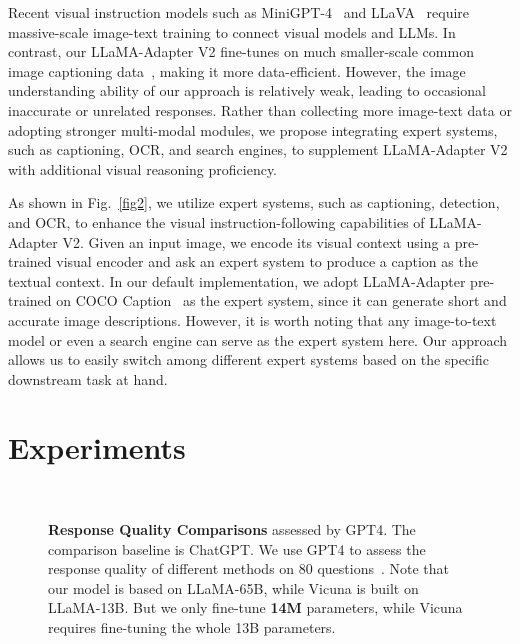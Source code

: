 \documentclass[10pt,twocolumn,letterpaper]{article}
\begin{document}
Recent visual instruction models such as MiniGPT-4~\cite{zou2022xdecoder} and LLaVA~\cite{liu2023visual} require massive-scale image-text training to connect visual models and LLMs. In contrast, our LLaMA-Adapter V2 fine-tunes on much smaller-scale common image captioning data~\cite{chen2015microsoft}, making it more data-efficient. However, the image understanding ability of our approach is relatively weak, leading to occasional inaccurate or unrelated responses.
Rather than collecting more image-text data or adopting stronger multi-modal modules, we propose integrating expert systems, such as captioning, OCR, and search engines, to supplement LLaMA-Adapter V2 with additional visual reasoning proficiency.





As shown in Fig.~\ref{fig2}, we utilize expert systems, such as captioning, detection, and OCR, to enhance the visual instruction-following capabilities of LLaMA-Adapter V2.
Given an input image, we encode its visual context using a pre-trained visual encoder and ask an expert system to produce a caption as the textual context. 
In our default implementation, we adopt LLaMA-Adapter pre-trained on COCO Caption~\cite{chen2015microsoft} as the expert system, since it can generate short and accurate image descriptions. 
However, it is worth noting that any image-to-text model or even a search engine can serve as the expert system here. 
Our approach allows us to easily switch among different expert systems based on the specific downstream task at hand.




\section{Experiments}
\label{sec:exps}

\begin{figure}[ht]
    \centering
     \\
    \caption{\textbf{Response Quality Comparisons} assessed by GPT4. The comparison baseline is ChatGPT. We use GPT4 to assess the response quality of different methods on 80 questions~\cite{vicuna2023}. Note that our model is based on LLaMA-65B, while Vicuna is built on LLaMA-13B. But we only fine-tune \textbf{14M} parameters, while Vicuna requires fine-tuning the whole 13B parameters.}
    \label{fig:gpts_scores_all}
\end{figure}
\end{document}
